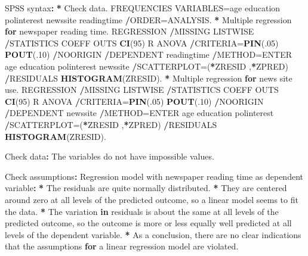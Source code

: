 \documentclass[a4paper]{book}
\newenvironment{Shaded}{\begin{snugshade}}{\end{snugshade}}
\newcommand{\KeywordTok}[1]{\textcolor[rgb]{0,0,0}{\textbf{#1}}}
\newcommand{\DecValTok}[1]{\textcolor[rgb]{0.00,0.00,0.00}{#1}}
\newcommand{\StringTok}[1]{\textcolor[rgb]{0.00,0.00,0.00}{#1}}
\newcommand{\ControlFlowTok}[1]{\textcolor[rgb]{0.00,0.00,0.00}{\textbf{#1}}}
\newcommand{\OperatorTok}[1]{\textcolor[rgb]{0.00,0.00,0.00}{\textbf{#1}}}
\newcommand{\ErrorTok}[1]{\textcolor[rgb]{0.00,0.00,0.00}{\textbf{#1}}}
\newcommand{\NormalTok}[1]{#1}
\theoremstyle{definition}
\theoremstyle{definition}
\theoremstyle{definition}
\theoremstyle{remark}
\begin{document}
\begin{Shaded}
\begin{Highlighting}[]
\NormalTok{SPSS syntax}\OperatorTok{:}\StringTok{  }
\StringTok{  }
\ErrorTok{*}\StringTok{ }\NormalTok{Check data.    }
\NormalTok{FREQUENCIES VARIABLES=age education polinterest newssite readingtime    }
  \OperatorTok{/}\NormalTok{ORDER=ANALYSIS.    }
\OperatorTok{*}\StringTok{ }\NormalTok{Multiple regression }\ControlFlowTok{for}\NormalTok{ newspaper reading time.    }
\NormalTok{REGRESSION    }
  \OperatorTok{/}\NormalTok{MISSING LISTWISE    }
  \OperatorTok{/}\NormalTok{STATISTICS COEFF OUTS }\KeywordTok{CI}\NormalTok{(}\DecValTok{95}\NormalTok{) R ANOVA    }
  \OperatorTok{/}\NormalTok{CRITERIA=}\KeywordTok{PIN}\NormalTok{(.}\DecValTok{05}\NormalTok{) }\KeywordTok{POUT}\NormalTok{(.}\DecValTok{10}\NormalTok{)    }
  \OperatorTok{/}\NormalTok{NOORIGIN    }
  \OperatorTok{/}\NormalTok{DEPENDENT readingtime    }
  \OperatorTok{/}\NormalTok{METHOD=ENTER age education polinterest newssite    }
  \OperatorTok{/}\NormalTok{SCATTERPLOT=(}\OperatorTok{*}\NormalTok{ZRESID ,}\OperatorTok{*}\NormalTok{ZPRED)    }
  \OperatorTok{/}\NormalTok{RESIDUALS }\KeywordTok{HISTOGRAM}\NormalTok{(ZRESID).    }
\OperatorTok{*}\StringTok{ }\NormalTok{Multiple regression }\ControlFlowTok{for}\NormalTok{ news site use.    }
\NormalTok{REGRESSION    }
  \OperatorTok{/}\NormalTok{MISSING LISTWISE    }
  \OperatorTok{/}\NormalTok{STATISTICS COEFF OUTS }\KeywordTok{CI}\NormalTok{(}\DecValTok{95}\NormalTok{) R ANOVA    }
  \OperatorTok{/}\NormalTok{CRITERIA=}\KeywordTok{PIN}\NormalTok{(.}\DecValTok{05}\NormalTok{) }\KeywordTok{POUT}\NormalTok{(.}\DecValTok{10}\NormalTok{)    }
  \OperatorTok{/}\NormalTok{NOORIGIN    }
  \OperatorTok{/}\NormalTok{DEPENDENT newssite    }
  \OperatorTok{/}\NormalTok{METHOD=ENTER age education polinterest    }
  \OperatorTok{/}\NormalTok{SCATTERPLOT=(}\OperatorTok{*}\NormalTok{ZRESID ,}\OperatorTok{*}\NormalTok{ZPRED)    }
  \OperatorTok{/}\NormalTok{RESIDUALS }\KeywordTok{HISTOGRAM}\NormalTok{(ZRESID).   }
  
\NormalTok{Check data}\OperatorTok{:}\StringTok{  }
\StringTok{  }
\NormalTok{The variables do not have impossible values.  }
  
\NormalTok{Check assumptions}\OperatorTok{:}\StringTok{  }
\StringTok{  }
\NormalTok{Regression model with newspaper reading time as dependent variable}\OperatorTok{:}\StringTok{  }
\StringTok{  }
\ErrorTok{*}\StringTok{ }\NormalTok{The residuals are quite normally distributed.  }
\OperatorTok{*}\StringTok{ }\NormalTok{They are centered around zero at all levels of the predicted outcome, so a}
\NormalTok{linear model seems to fit the data.}
\OperatorTok{*}\StringTok{ }\NormalTok{The variation }\ControlFlowTok{in}\NormalTok{ residuals is about the same at all levels of the predicted}
\NormalTok{outcome, so the outcome is more or less equally well predicted at all levels}
\NormalTok{of the dependent variable.}
\OperatorTok{*}\StringTok{ }\NormalTok{As a conclusion, there are no clear indications that the assumptions }\ControlFlowTok{for}\NormalTok{ a}
\NormalTok{linear regression model are violated.}
  

\end{Highlighting}
\end{Shaded}
\end{document}
